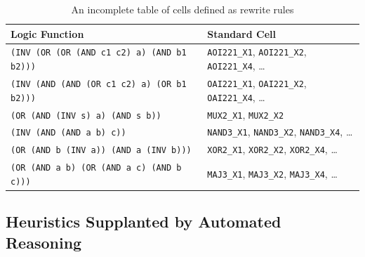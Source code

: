 \documentclass[10pt,letterpaper]{article}
\begin{document}
\begin{table}[h]
    \centering
    \begin{tabular}{ll}
        \toprule
        \textbf{Logic Function}                            & \textbf{Standard Cell}                                                \\ \midrule
        \texttt{(INV (OR (OR (AND c1 c2) a) (AND b1 b2)))} & \texttt{AOI221\_X1}, \texttt{AOI221\_X2}, \texttt{AOI221\_X4}, \ldots \\
        \texttt{(INV (AND (AND (OR c1 c2) a) (OR b1 b2)))} & \texttt{OAI221\_X1}, \texttt{OAI221\_X2}, \texttt{OAI221\_X4}, \ldots \\
        \texttt{(OR (AND (INV s) a) (AND s b))}            & \texttt{MUX2\_X1}, \texttt{MUX2\_X2}                                  \\
        \texttt{(INV (AND (AND a b) c))}                   & \texttt{NAND3\_X1}, \texttt{NAND3\_X2}, \texttt{NAND3\_X4}, \ldots    \\
        \texttt{(OR (AND b (INV a)) (AND a (INV b)))}      & \texttt{XOR2\_X1}, \texttt{XOR2\_X2}, \texttt{XOR2\_X4}, \ldots       \\
        \texttt{(OR (AND a b) (OR (AND a c) (AND b c)))}   & \texttt{MAJ3\_X1}, \texttt{MAJ3\_X2}, \texttt{MAJ3\_X4}, \ldots       \\
        \bottomrule
    \end{tabular}
    \caption{An incomplete table of cells defined as rewrite rules}\label{tab:morecells}
\end{table}

\subsection{Heuristics Supplanted by Automated Reasoning}\label{sec:alt:heuristics}
\end{document}

